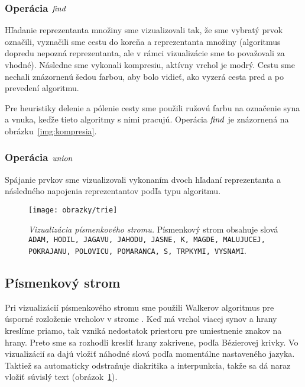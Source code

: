 \subsubsection{Operácia $\mathop{\mathit{find}}$}

Hľadanie reprezentanta množiny sme vizualizovali tak, že sme vybratý prvok 
označili, vyznačili sme cestu do koreňa a reprezentanta množiny 
(algoritmus dopredu nepozná reprezentanta, ale v rámci vizualizácie sme to 
považovali za vhodné). Následne sme vykonali kompresiu, aktívny vrchol je 
modrý. Cestu sme nechali 
znázornenú šedou farbou, aby bolo vidieť, ako vyzerá cesta pred a po prevedení 
algoritmu. 

Pre heuristiky delenie a pólenie cesty sme použili ružovú farbu na označenie 
syna a vnuka, keďže tieto algoritmy s nimi pracujú. Operácia $\mathop{\mathit{find}}$ je 
znázornená na obrázku~\ref{img:kompresia}.

\subsubsection{Operácia $\mathop{\mathit{union}}$}

Spájanie prvkov sme vizualizovali vykonaním dvoch hľadaní reprezentanta a 
následného napojenia reprezentantov podľa typu algoritmu.

\begin{figure}
\centering
\texttt{[image: obrazky/trie]}
\caption{\emph{Vizualizácia písmenkového stromu.} Písmenkový strom obsahuje 
slová {\tt ADAM\uz, HODIL\uz, JAGAVU\uz, JAHODU\uz, JASNE\uz, K\uz, MAGDE\uz, 
MALUJUCEJ\uz, POKRAJANU\uz, POLOVICU\uz, POMARANCA\uz, S\uz, TRPKYMI\uz, 
VYSNAMI\uz}.}
\label{img:trieshow}
\end{figure}


\subsection{Písmenkový strom}

Pri vizualizácií písmenkového stromu sme použili 
Walkerov algoritmus pre úsporné rozloženie vrcholov v strome
\citep{walker}. Keď má vrchol viacej synov a hrany kreslíme priamo, tak vzniká 
nedostatok priestoru pre umiestnenie znakov na hrany. Preto sme sa rozhodli 
kresliť hrany zakrivene, podľa Bézierovej krivky. 
Vo vizualizácií sa dajú vložiť náhodné slová podľa momentálne nastaveného 
jazyka. Taktiež sa automaticky odstraňuje diakritika a interpunkcia, takže 
sa dá naraz vložiť súvislý text (obrázok~\ref{img:trieshow}).

